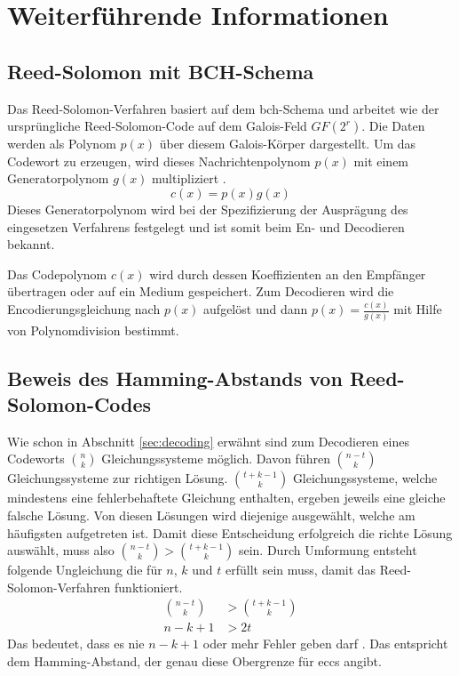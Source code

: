 \chapter{Weiterführende Informationen}\label{app:supplemental-information}

\section{Reed-Solomon mit BCH-Schema}\label{app:bch-rs}

Das Reed-Solomon-Verfahren basiert auf dem \acrfull{bch}-Schema und arbeitet wie der ursprüngliche Reed-Solomon-Code auf dem Galois-Feld $GF(2^r)$.
Die Daten werden als Polynom $p(x)$ über diesem Galois-Körper dargestellt. 
Um das Codewort zu erzeugen, wird dieses Nachrichtenpolynom $p(x)$ mit einem Generatorpolynom $g(x)$ multipliziert \cite{stoneMultipleBurstErrorCorrection1963}.
\[
c(x)=p(x)g(x)
\]
Dieses Generatorpolynom wird bei der Spezifizierung der Ausprägung des eingesetzen Verfahrens festgelegt und ist somit beim En- und Decodieren bekannt.

Das Codepolynom $c(x)$ wird durch dessen Koeffizienten an den Empfänger übertragen oder auf ein Medium gespeichert.
Zum Decodieren wird die Encodierungsgleichung nach $p(x)$ aufgelöst und dann $p(x)=\frac{c(x)}{g(x)}$ mit Hilfe von Polynomdivision bestimmt.

\section{Beweis des Hamming-Abstands von Reed-Solomon-Codes}\label{app:hammingDistanceRS}

Wie schon in Abschnitt \ref{sec:decoding} erwähnt sind zum Decodieren eines Codeworts $\binom{n}{k}$ Gleichungssysteme möglich.
Davon führen $\binom{n-t}{k}$ Gleichungssysteme zur richtigen Lösung.
$\binom{t+k-1}{k}$ Gleichungssysteme, welche mindestens eine fehlerbehaftete Gleichung enthalten, ergeben jeweils eine gleiche falsche Lösung.
Von diesen Lösungen wird diejenige ausgewählt, welche am häufigsten aufgetreten ist.
Damit diese Entscheidung erfolgreich die richte Lösung auswählt, muss also $\binom{n-t}{k} > \binom{t+k-1}{k}$ sein.
Durch Umformung entsteht folgende Ungleichung die für $n$, $k$ und $t$ erfüllt sein muss, damit das Reed-Solomon-Verfahren funktioniert.
\begin{align}
\binom{n-t}{k} &> \binom{t+k-1}{k} \nonumber\\
n-k+1 &> 2t \nonumber
\end{align}
Das bedeutet, dass es nie $n-k+1$ oder mehr Fehler geben darf \cite{reedPolynomialCodesCertain1960}.
Das entspricht dem Hamming-Abstand, der genau diese Obergrenze für \acrshort{ecc}s angibt.

